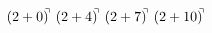 \documentclass[preview]{standalone}
\begin{document}
\begin{align*}
(2+0)^{\hspace{-0.1cm}\urcorner} \ (2+4)^{\hspace{-0.1cm}\urcorner} \ (2+7)^{\hspace{-0.1cm}\urcorner} \ (2+10)^{\hspace{-0.1cm}\urcorner}
\end{align*}
\end{document}
